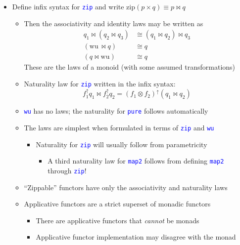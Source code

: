 \begin{itemize}
\item Define infix syntax for \texttt{\textcolor{blue}{\footnotesize{}zip}}
and write $\text{zip}\left(p\times q\right)\equiv p\bowtie q$
\begin{itemize}
\item Then the associativity and identity laws may be written as{\footnotesize{}
\begin{align*}
q_{1}\bowtie\left(q_{2}\bowtie q_{3}\right) & \cong\left(q_{1}\bowtie q_{2}\right)\bowtie q_{3}\\
\left(\text{wu}\,\bowtie q\right) & \cong q\\
\left(q\bowtie\text{wu}\right) & \cong q
\end{align*}
}These are the laws of a monoid (with some assumed transformations)
\item Naturality law for \texttt{\textcolor{blue}{\footnotesize{}zip}} written
in the infix syntax:{\footnotesize{}
\[
f_{1}^{\uparrow}q_{1}\bowtie f_{2}^{\uparrow}q_{2}=\left(f_{1}\otimes f_{2}\right)^{\uparrow}\left(q_{1}\bowtie q_{2}\right)
\]
}{\footnotesize\par}
\item \texttt{\textcolor{blue}{\footnotesize{}wu}} has no laws; the naturality
for \texttt{\textcolor{blue}{\footnotesize{}pure}} follows automatically
\item The laws are simplest when formulated in terms of \texttt{\textcolor{blue}{\footnotesize{}zip}}
and \texttt{\textcolor{blue}{\footnotesize{}wu}} 
\begin{itemize}
\item Naturality for \texttt{\textcolor{blue}{\footnotesize{}zip}} will
usually follow from parametricity
\begin{itemize}
\item A third naturality law for \texttt{\textcolor{blue}{\footnotesize{}map2}}
follows from defining \texttt{\textcolor{blue}{\footnotesize{}map2}}
through \texttt{\textcolor{blue}{\footnotesize{}zip}}!
\end{itemize}
\end{itemize}
\item ``Zippable'' functors have only the associativity and naturality
laws
\item Applicative functors are a strict superset of monadic functors
\begin{itemize}
\item There are applicative functors that \emph{cannot} be monads
\item Applicative functor implementation may disagree with the monad
\end{itemize}
\end{itemize}
\end{itemize}


